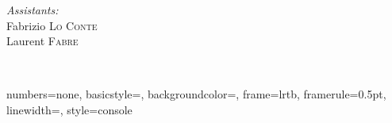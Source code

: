 \begin{titlepage}
\begin{center}
\begin{minipage}{0.4\textwidth}
\begin{flushright}
        \emph{Assistants:} \\
        Fabrizio \textsc{Lo Conte}\\
        Laurent \textsc{Fabre}\\[0.5cm]
      \end{flushright}
    \end{minipage} \\[2cm]
     
    \vfill
     
    {\large \thedate}
     
  \end{center}

\end{titlepage}

\newpage{}

\fancyfoot{}
\lhead{}
\cfoot{\thepage}        %
\rfoot{\thedate} 


\setcounter{secnumdepth}{5}

\tableofcontents{}

\newpage

\lstset{language=C}



{
  numbers=none,
  basicstyle=\ttfamily\footnotesize,
  backgroundcolor=\color{grey97},
  frame=lrtb,
  framerule=0.5pt,
  linewidth=\textwidth,
}
{
  style=console
}

\lstset{
  style=console
}



